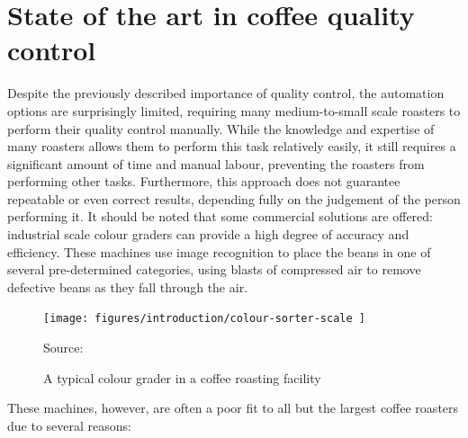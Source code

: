 \section{State of the art in coffee quality control}
\label{sec:qc-state-of-the-art} Despite the previously described importance of quality
control, the automation options are surprisingly limited, requiring many medium-to-small
scale roasters to perform their quality control manually. While the knowledge
and expertise of many roasters allows them to perform this task relatively
easily, it still requires a significant amount of time and manual labour,
preventing the roasters from performing other tasks. Furthermore, this approach
does not guarantee repeatable or even correct results, depending fully on the judgement
of the person performing it.
\pagebreak
It should be noted that some commercial solutions are offered: industrial scale colour
graders can provide a high degree of accuracy and efficiency. These machines use
image recognition to place the beans in one of several pre-determined categories,
using blasts of compressed air to remove defective beans as they fall through the
air.
\begin{figure}
	\texttt{[image: 
		figures/introduction/colour-sorter-scale
	]}
	\caption*
	{Source: \cite{colourSorterImg}}
	\caption{A typical colour grader in a coffee roasting facility}
	\label{fig:colourSorterExample}
	\vspace{-3em}
\end{figure}
These machines, however, are often a poor fit to all but the largest coffee
roasters due to several reasons:
